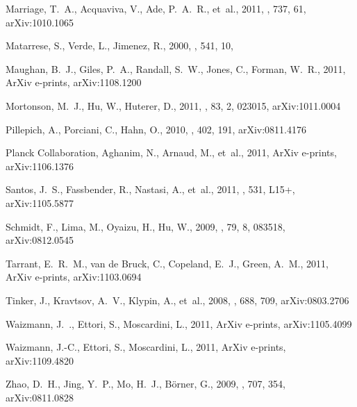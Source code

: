 \documentclass[twocolumn,useAMS,usenatbib,usegraphicx]{mn2e}
\begin{document}
\begin{thebibliography}{37}
{Marriage}, T.~A., {Acquaviva}, V., {Ade}, P.~A.~R., et~al., 2011, \apj, 737,
  61, \eprint arXiv:{1010.1065}

{Matarrese}, S., {Verde}, L., {Jimenez}, R., 2000, \apj, 541, 10,

{Maughan}, B.~J., {Giles}, P.~A., {Randall}, S.~W., {Jones}, C., {Forman},
  W.~R., 2011, ArXiv e-prints, \eprint arXiv:{1108.1200}

{Mortonson}, M.~J., {Hu}, W., {Huterer}, D., 2011, \prd, 83, 2, 023015, \eprint
  arXiv:{1011.0004}

{Pillepich}, A., {Porciani}, C., {Hahn}, O., 2010, \mnras, 402, 191, \eprint
  arXiv:{0811.4176}

{Planck Collaboration}, {Aghanim}, N., {Arnaud}, M., et~al., 2011, ArXiv
  e-prints, \eprint arXiv:{1106.1376}

{Santos}, J.~S., {Fassbender}, R., {Nastasi}, A., et~al., 2011, \aap, 531,
  L15+, \eprint arXiv:{1105.5877}

{Schmidt}, F., {Lima}, M., {Oyaizu}, H., {Hu}, W., 2009, \prd, 79, 8, 083518,
  \eprint arXiv:{0812.0545}

{Tarrant}, E.~R.~M., {van de Bruck}, C., {Copeland}, E.~J., {Green}, A.~M.,
  2011, ArXiv e-prints, \eprint arXiv:{1103.0694}

{Tinker}, J., {Kravtsov}, A.~V., {Klypin}, A., et~al., 2008, \apj, 688, 709,
  \eprint arXiv:{0803.2706}

{Waizmann}, J.~., {Ettori}, S., {Moscardini}, L., 2011{}, ArXiv
  e-prints, \eprint arXiv:{1105.4099}

{Waizmann}, J.-C., {Ettori}, S., {Moscardini}, L., 2011{}, ArXiv
  e-prints, \eprint arXiv:{1109.4820}

{Zhao}, D.~H., {Jing}, Y.~P., {Mo}, H.~J., {B{\"o}rner}, G., 2009, \apj, 707,
  354, \eprint arXiv:{0811.0828}

\end{thebibliography}
\end{document}
